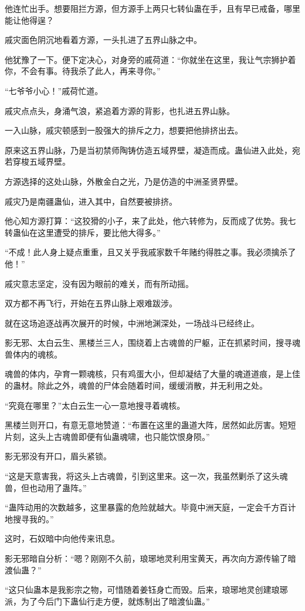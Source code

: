 \begin{this_body}
他连忙出手。想要阻拦方源，但方源手上两只七转仙蛊在手，且有早已戒备，哪里能让他得逞？

戚灾面色阴沉地看着方源，一头扎进了五界山脉之中。

他犹豫了一下。便下定决心，对身旁的戚荷道：“你就坐在这里，我让气宗狮护着你，不会有事。待我杀了此人，再来寻你。”

“七爷爷小心！”戚荷忙道。

戚灾点点头，身涌气浪，紧追着方源的背影，也扎进五界山脉。

一入山脉，戚灾顿感到一股强大的排斥之力，想要把他排挤出去。

原来这五界山脉，乃是当初禁师陶铸仿造五域界壁，凝造而成。蛊仙进入此处，宛若穿梭五域界壁。

方源选择的这处山脉，外散金白之光，乃是仿造的中洲圣贤界壁。

戚灾乃是南疆蛊仙，进入其中，自然要被排挤。

他心知方源打算：“这狡猾的小子，来了此处，他六转修为，反而成了优势。我七转蛊仙在这里遭受的排斥，要比他大得多。”

“不成！此人身上疑点重重，且又关乎我戚家数千年赌约得胜之事。我必须擒杀了他！”

戚灾意志坚定，没有因为眼前的难关，而有所动摇。

双方都不再飞行，开始在五界山脉上艰难跋涉。

就在这场追逐战再次展开的时候，中洲地渊深处，一场战斗已经终止。

影无邪、太白云生、黑楼兰三人，围绕着上古魂兽的尸躯，正在抓紧时间，搜寻魂兽体内的魂核。

魂兽的体内，孕育一颗魂核，只有鸡蛋大小，但却凝结了大量的魂道道痕，是上佳的蛊材。除此之外，魂兽的尸体会随着时间，缓缓消散，并无利用之处。

“究竟在哪里？”太白云生一心一意地搜寻着魂核。

黑楼兰则开口，有意无意地赞道：“布置在这里的蛊道大阵，居然如此厉害。短短片刻，这头上古魂兽即便有仙蛊魂啸，也只能饮恨身陨。”

影无邪没有开口，眉头紧锁。

“这是天意害我，将这头上古魂兽，引到这里来。这一次，我虽然剿杀了这头魂兽，但也动用了蛊阵。”

“蛊阵动用的次数越多，这里暴露的危险就越大。毕竟中洲天庭，一定会千方百计地搜寻我的。”

这时，石奴暗中向他传来讯息。

影无邪暗自分析：“嗯？刚刚不久前，琅琊地灵利用宝黄天，再次向方源传输了暗渡仙蛊？”

“这只仙蛊本是我影宗之物，可惜随着姜钰身亡而毁。后来，琅琊地灵创建琅琊派，为了今后门下蛊仙行走方便，就炼制出了暗渡仙蛊。”


\end{this_body}
